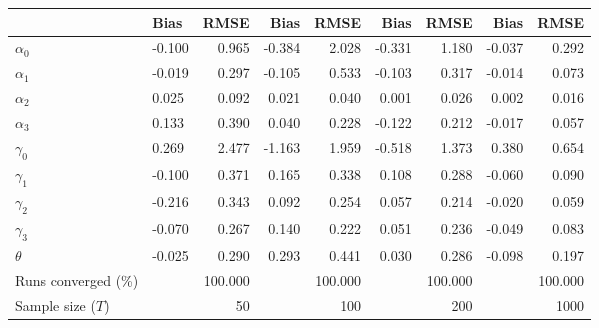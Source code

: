 
\begin{tabular}[t]{llrrrrrrr}
\toprule
  & Bias & RMSE & Bias & RMSE & Bias & RMSE & Bias & RMSE\\
\midrule
$\alpha_{0}$ & -0.100 & 0.965 & -0.384 & 2.028 & -0.331 & 1.180 & -0.037 & 0.292\\
$\alpha_{1}$ & -0.019 & 0.297 & -0.105 & 0.533 & -0.103 & 0.317 & -0.014 & 0.073\\
$\alpha_{2}$ & 0.025 & 0.092 & 0.021 & 0.040 & 0.001 & 0.026 & 0.002 & 0.016\\
$\alpha_{3}$ & 0.133 & 0.390 & 0.040 & 0.228 & -0.122 & 0.212 & -0.017 & 0.057\\
$\gamma_{0}$ & 0.269 & 2.477 & -1.163 & 1.959 & -0.518 & 1.373 & 0.380 & 0.654\\
$\gamma_{1}$ & -0.100 & 0.371 & 0.165 & 0.338 & 0.108 & 0.288 & -0.060 & 0.090\\
$\gamma_{2}$ & -0.216 & 0.343 & 0.092 & 0.254 & 0.057 & 0.214 & -0.020 & 0.059\\
$\gamma_{3}$ & -0.070 & 0.267 & 0.140 & 0.222 & 0.051 & 0.236 & -0.049 & 0.083\\
$\theta$ & -0.025 & 0.290 & 0.293 & 0.441 & 0.030 & 0.286 & -0.098 & 0.197\\
Runs converged (\%) &  & 100.000 &  & 100.000 &  & 100.000 &  & 100.000\\
Sample size ($T$) &  & 50 &  & 100 &  & 200 &  & 1000\\
\bottomrule
\end{tabular}
